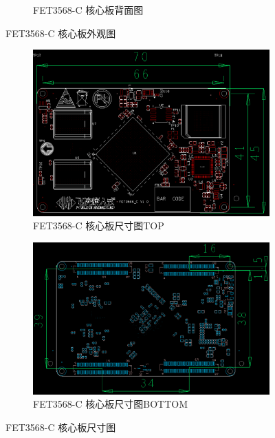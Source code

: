 \begin{enumerate}
\begin{figure}
\begin{subfigure}{0.8\textwidth}
      \caption{FET3568-C 核心板背面图}
      \label{fig:FET3568-COutlookBottom}
    \end{subfigure}
    \caption{FET3568-C 核心板外观图}
    \label{fig:FET3568-COutlook}
  \end{figure}
  \begin{figure}
    \centering
    \begin{subfigure}[b]{0.8\textwidth}
      \centering
      \includegraphics[width=\textwidth]{./figures/FET3568-C核心板尺寸图TOP.png}
      \caption{FET3568-C 核心板尺寸图TOP}
      \label{fig:FET3568-CSizeTop}
    \end{subfigure}
    \begin{subfigure}[b]{0.8\textwidth}
      \centering
      \includegraphics[width=\textwidth]{./figures/FET3568-C核心板尺寸图BOTTOM.png}
      \caption{FET3568-C 核心板尺寸图BOTTOM}
      \label{fig:FET3568-CSizeBottom}
    \end{subfigure}
    \caption{FET3568-C 核心板尺寸图}
    \label{fig:FET3568-CSize}
  \end{figure}


\end{enumerate}
